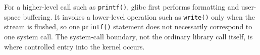 For a higher-level call such as \texttt{printf()}, glibc first performs
formatting and user-space buffering.  It invokes a lower-level operation
such as \texttt{write()} only when the stream is flushed, so one
\texttt{printf()} statement does not necessarily correspond to one system
call.  The system-call boundary, not the ordinary library call itself, is
where controlled entry into the kernel occurs.
